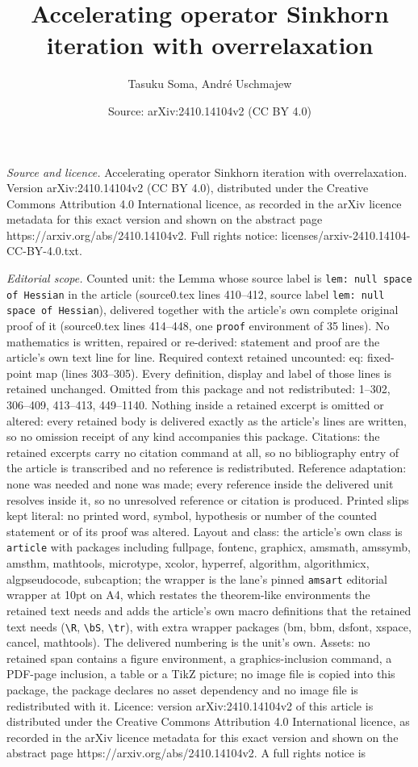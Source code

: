 \documentclass[10pt,a4paper]{amsart}
\title[Accelerating operator Sinkhorn iteration with overrelaxation]{Accelerating operator Sinkhorn iteration with overrelaxation}
\author{Tasuku Soma, Andr\'e Uschmajew}
\date{Source: arXiv:2410.14104v2 (CC BY 4.0)}
\begin{document}
\maketitle

\noindent\emph{Source and licence.} Accelerating operator Sinkhorn iteration with overrelaxation. Version arXiv:2410.14104v2 (CC BY 4.0), distributed under the Creative Commons Attribution 4.0 International licence, as recorded in the arXiv licence metadata for this exact version and shown on the abstract page https://arxiv.org/abs/2410.14104v2. Full rights notice: licenses/arxiv-2410.14104-CC-BY-4.0.txt.\par\smallskip

\noindent\textit{Editorial scope.} Counted unit: the Lemma whose source label is \texttt{lem: null space of Hessian} in the article (source0.tex lines 410--412, source label \texttt{lem: null space of Hessian}), delivered together with the article's own complete original proof of it (source0.tex lines 414--448, one \texttt{proof} environment of 35 lines). No mathematics is written, repaired or re-derived: statement and proof are the article's own text line for line. Required context retained uncounted: eq: fixed-point map (lines 303--305). Every definition, display and label of those lines is retained unchanged. Omitted from this package and not redistributed: 1--302, 306--409, 413--413, 449--1140. Nothing inside a retained excerpt is omitted or altered: every retained body is delivered exactly as the article's lines are written, so no omission receipt of any kind accompanies this package. Citations: the retained excerpts carry no citation command at all, so no bibliography entry of the article is transcribed and no reference is redistributed. Reference adaptation: none was needed and none was made; every reference inside the delivered unit resolves inside it, so no unresolved reference or citation is produced. Printed slips kept literal: no printed word, symbol, hypothesis or number of the counted statement or of its proof was altered. Layout and class: the article's own class is \texttt{article} with packages including fullpage, fontenc, graphicx, amsmath, amssymb, amsthm, mathtools, microtype, xcolor, hyperref, algorithm, algorithmicx, algpseudocode, subcaption; the wrapper is the lane's pinned \texttt{amsart} editorial wrapper at 10pt on A4, which restates the theorem-like environments the retained text needs and adds the article's own macro definitions that the retained text needs (\texttt{\textbackslash R}, \texttt{\textbackslash bS}, \texttt{\textbackslash tr}), with extra wrapper packages (bm, bbm, dsfont, xspace, cancel, mathtools). The delivered numbering is the unit's own. Assets: no retained span contains a figure environment, a graphics-inclusion command, a PDF-page inclusion, a table or a TikZ picture; no image file is copied into this package, the package declares no asset dependency and no image file is redistributed with it. Licence: version arXiv:2410.14104v2 of this article is distributed under the Creative Commons Attribution 4.0 International licence, as recorded in the arXiv licence metadata for this exact version and shown on the abstract page https://arxiv.org/abs/2410.14104v2. A full rights notice is 
\end{document}

